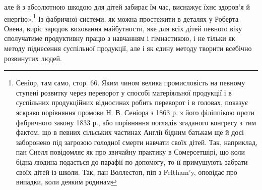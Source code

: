 але й з абсолютною шкодою для дітей забирає їм час, виснажує
їхнє здоров’я й енергію».\footnote{
Сеніор, там само, стор. 66. Яким чином велика промисловість на
певному ступені розвитку через переворот у способі матеріяльної продукції
і в суспільних продукційних відносинах робить переворот і в головах,
показує яскраво порівняння промови Н. В. Сеніора з 1863 р. з його філіппікою
проти фабричного закону 1833 р., або порівняння поглядів згаданого
конгресу з тим фактом, що в певних сільських частинах Англії бідним
батькам ще й досі заборонено під загрозою голодної смерти навчати
своїх дітей. Так, наприклад, пан Снелл повідомляє як про звичайну практику
в Сомерсетшірі, що коли бідна людина подається до парафії
по допомогу, то її примушують забрати своїх дітей із школи. Так, пан
Воллестоп, піп з Feltham’y, оповідає про випадки, коли деяким родинам
} Із фабричної системи, як можна простежити
в деталях у Роберта Овена, виріс зародок виховання
майбутности, яке для всіх дітей певного віку сполучатиме продуктивну
працю з навчанням і гімнастикою, і не тільки як методу
піднесення суспільної продукції, але і як єдину методу творити
всебічно розвинутих людей.

